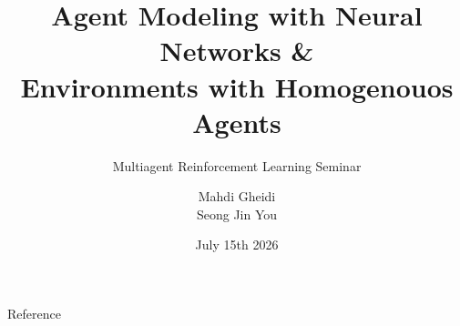 \documentclass[aspectratio=3218, 10pt, usepdftitle=false]{beamer}
\title{Agent Modeling with Neural Networks \&\\ Environments with Homogenouos Agents}
\subtitle{Multiagent Reinforcement Learning Seminar}
\author{Mahdi Gheidi \\ Seong Jin You}
\institute{Neurorobotics Group\\Department of Computer Science\\University of Freiburg}
\date{July 15th 2026}
\begin{document}
\begin{frame}[plain]
    \titlepage{}
\end{frame}





\begin{frame}[plain]{Reference}
    \footnotesize
    \nocite{*}
    
\end{frame}
\end{document}
